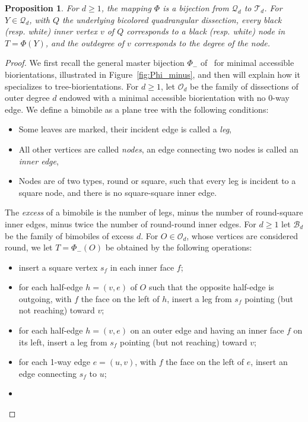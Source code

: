 \documentclass[letter]{amsart}
\numberwithin{theo}{section}
\newtheorem{prop}[theo]{Proposition}
\theoremstyle{remark}
\def\cB{\mathcal{B}}
\def\cQ{\mathcal{Q}}
\def\cO{\mathcal{O}}
\def\cT{\mathcal{T}}
\begin{document}
\begin{prop}\label{prop:Phi}
For $d\geq 1$, the mapping $\Phi$ is a bijection from $\cQ_d$ to $\cT_d$. 
For $Y\in\cQ_d$, with $Q$ the underlying bicolored quadrangular dissection, every black (resp. white) inner vertex $v$ of $Q$ corresponds to a black (resp. white) node in $T=\Phi(Y)$, and the outdegree of $v$ corresponds to the degree of the node.  
\end{prop}
\begin{proof}
We first recall the general master bijection $\Phi_-$ of~\cite{Bernardi-Fusy:dangulations}  for minimal accessible biorientations, illustrated in Figure~\ref{fig:Phi_minus}, and then will explain how it specializes to tree-biorientations.  
For $d\geq 1$, let $\cO_d$ be the family of dissections of outer degree $d$ endowed with a minimal accessible biorientation with no 0-way edge. 
We define a bimobile as a plane tree with the following conditions:
\begin{itemize}
\item
Some leaves are marked, their incident edge is called a \emph{leg},
\item
All other vertices are called \emph{nodes}, an edge connecting two nodes is called an \emph{inner edge},
\item
Nodes are of two types, round or square, such that every leg is incident to a square node,
and there is no square-square inner edge. 
\end{itemize}
The \emph{excess} of a bimobile is the number of legs, minus the number of round-square inner edges, minus twice the number of round-round inner edges. 
For $d\geq 1$ let $\cB_d$ be the family of bimobiles of 
 excess $d$. For $O\in\cO_d$, whose vertices are considered round, we let $T=\Phi_-(O)$ be obtained by the following operations:
\begin{itemize}
\item
insert a square vertex $s_f$ in each inner face $f$;
\item
for each half-edge $h=(v,e)$ of $O$ such that the opposite half-edge is outgoing, with $f$ the face on the left of $h$, insert a leg from $s_f$ pointing (but not reaching) toward $v$;
\item
for each half-edge $h=(v,e)$ on an outer edge and having an inner face $f$ on its left, insert a leg from $s_f$ pointing (but not reaching) toward $v$;
\item
for each 1-way edge $e=(u,v)$, with $f$ the face on the left of $e$, insert an edge connecting $s_f$ to $u$;
\item

\end{itemize}
\end{proof}
\end{document}

